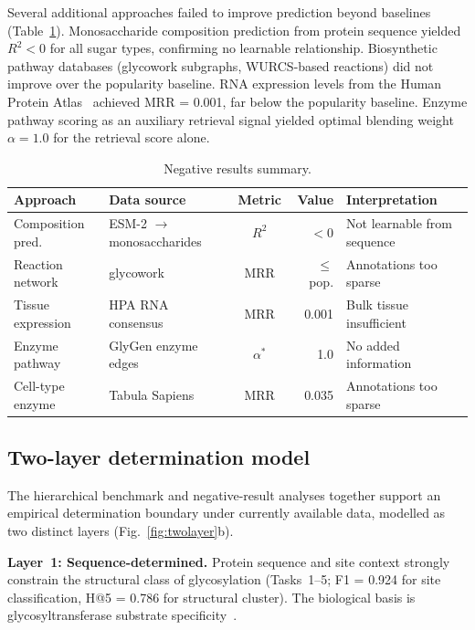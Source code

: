 \documentclass[11pt,a4paper]{article}
\begin{document}
Several additional approaches failed to improve prediction beyond baselines
(Table~\ref{tab:negative}). Monosaccharide composition prediction from protein
sequence yielded $R^2 < 0$ for all sugar types, confirming no learnable
relationship. Biosynthetic pathway databases (glycowork subgraphs,
WURCS-based reactions) did not improve over the popularity baseline. RNA
expression levels from the Human Protein Atlas~\cite{uhlen2015} achieved
MRR = 0.001, far below the popularity baseline. Enzyme pathway scoring as an
auxiliary retrieval signal yielded optimal blending weight $\alpha = 1.0$ for the
retrieval score alone.

\begin{table}[ht]
\centering
\caption{Negative results summary.}
\label{tab:negative}
\small
\begin{tabular}{llcrp{3.5cm}}
\toprule
\textbf{Approach} & \textbf{Data source} & \textbf{Metric} & \textbf{Value} & \textbf{Interpretation} \\
\midrule
Composition pred. & ESM-2 $\to$ monosaccharides & $R^2$ & $< 0$ & Not learnable from sequence \\
Reaction network & glycowork & MRR & $\leq$ pop. & Annotations too sparse \\
Tissue expression & HPA RNA consensus & MRR & 0.001 & Bulk tissue insufficient \\
Enzyme pathway & GlyGen enzyme edges & $\alpha^*$ & 1.0 & No added information \\
Cell-type enzyme & Tabula Sapiens & MRR & 0.035 & Annotations too sparse \\
\bottomrule
\end{tabular}
\end{table}

\subsection{Two-layer determination model}

The hierarchical benchmark and negative-result analyses together support an
empirical determination boundary under currently available data, modelled as two distinct layers
(Fig.~\ref{fig:twolayer}b).

\textbf{Layer~1: Sequence-determined.} Protein sequence and site context
strongly constrain the structural class of glycosylation (Tasks~1--5;
F1 = 0.924 for site classification, H@5 = 0.786 for structural cluster). The
biological basis is glycosyltransferase substrate
specificity~\cite{schjoldager2020,narimatsu2019}.
\end{document}
